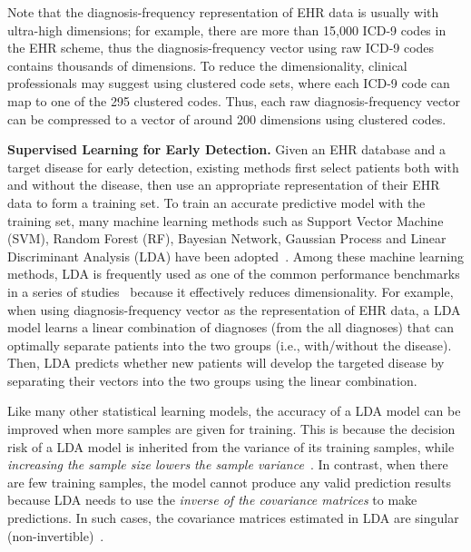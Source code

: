 Note that the diagnosis-frequency representation of EHR data is usually with ultra-high dimensions; for example, there are more than 15,000 ICD-9 codes in the EHR scheme, thus the diagnosis-frequency vector using raw ICD-9 codes contains thousands of dimensions.
To reduce the dimensionality, clinical professionals may suggest using clustered code sets, where each ICD-9 code can map to one of the 295 clustered codes.
Thus, each raw diagnosis-frequency vector can be compressed to a vector of around 200 dimensions using clustered codes.
 

\textbf{Supervised Learning for Early Detection.} 
Given an EHR database and a target disease for early detection, existing methods first select patients both with and without the disease, then use an appropriate representation of their EHR data to form a training set.
To train an accurate predictive model with the training set, many machine learning methods such as Support Vector Machine (SVM), Random Forest (RF), Bayesian Network, Gaussian Process and Linear Discriminant Analysis (LDA) have been adopted~\cite{sun2012supervised,7091853,personalized2015,zhang_mseq_2015,jensen2001mining,liu_temporal_2015,cazzanti_local_2007}.
Among these machine learning methods, LDA is frequently used as one of the common performance benchmarks in a series of studies~\cite{cazzanti_local_2007,zhang_mseq_2015,kalina2013selecting,karlsson2014handling,wang2014clinical} because it effectively reduces dimensionality.
For example, when using diagnosis-frequency vector as the representation of EHR data, a LDA model learns a linear combination of diagnoses (from the all diagnoses) that can optimally separate patients into the two groups (i.e., with/without the disease).
Then, LDA predicts whether new patients will develop the targeted disease by separating their vectors into the two groups using the linear combination.
 

Like many other statistical learning models, the accuracy of a LDA model can be improved when more samples are given for training.
This is because the decision risk of a LDA model is inherited from the variance of its training samples, while \emph{increasing the sample size lowers the sample variance}~\cite{hsu1947complete,qiao2008effective}.
In contrast, when there are few training samples, the model cannot produce any valid prediction results because LDA needs to use the \emph{inverse of the covariance matrices} to make predictions.
In such cases, the covariance matrices estimated in LDA are singular (non-invertible)~\cite{huang2002solving,gao2006direct}.
 

